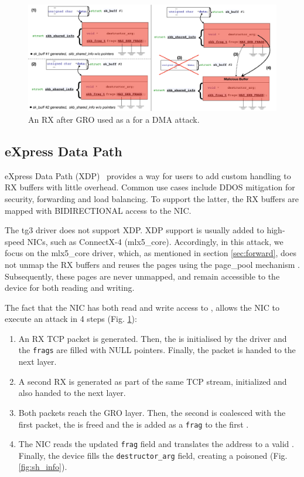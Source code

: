 \begin{figure}[t]
    \centering
    \includegraphics[width=\linewidth]{figs/gro.pdf}
    \caption{An RX \skb{} after GRO used as a \means{} for a DMA attack.}
    \label{fig:gro}
\end{figure}

\subsection{eXpress Data Path}\label{sec:xdp}

eXpress Data Path (XDP)~\cite{xdp} provides a way for users to add custom handling to RX buffers with little overhead. Common use cases include DDOS mitigation for security, forwarding and load balancing. To support the latter, the RX buffers are mapped with BIDIRECTIONAL access to the NIC. 

The tg3 driver does not support XDP. XDP support is usually added to high-speed NICs, such as ConnectX-4 (mlx5\_core). Accordingly, in this attack, we focus on the mlx5\_core driver, which, as mentioned in section \ref{sec:forward}, does not unmap the RX buffers and reuses the pages using the page\_pool mechanism \cite{page_pool}. Subsequently, these pages are never unmapped, and remain accessible to the device for both reading and writing. 

The fact that the NIC has both read and write access to \shinfo, allows the NIC to execute an attack in 4 steps (Fig. \ref{fig:gro}):
\begin{enumerate}
    \item An RX TCP packet is generated. Then, the \shinfo{} is initialised by the driver and the \texttt{frags} are filled with NULL pointers. Finally, the packet is handed to the next layer.
    
    \item A second RX \skb{} is generated as part of the same TCP stream, initialized and also handed to the next layer.
    
    \item Both packets reach the GRO layer. Then, the second \skb{} is coalesced with the first packet, the \skb{} is freed and the \data{} is added as a \texttt{frag} to the first \skb.
    
    \item The NIC reads the updated \texttt{frag} field and translates the \page{} address to a valid \kva{}. Finally, the device fills the \texttt{destructor\_arg} field, creating a poisoned \skb{} (Fig. \ref{fig:sh_info}).
\end{enumerate}

